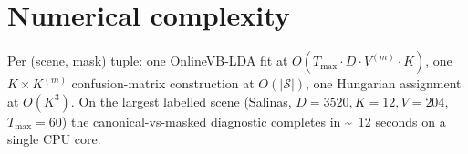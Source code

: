 \documentclass[11pt,a4paper]{article}
\begin{document}
\section{Numerical complexity}

Per (scene, mask) tuple: one OnlineVB-LDA fit at $O(T_{\max} \cdot D
\cdot V^{(m)} \cdot K)$, one $K \times K^{(m)}$ confusion-matrix
construction at $O(|\mathcal{S}|)$, one Hungarian assignment at
$O(K^3)$. On the largest labelled scene (Salinas, $D = 3520, K = 12,
V = 204$, $T_{\max} = 60$) the canonical-vs-masked diagnostic
completes in \textasciitilde~12 seconds on a single CPU core.



\end{document}
